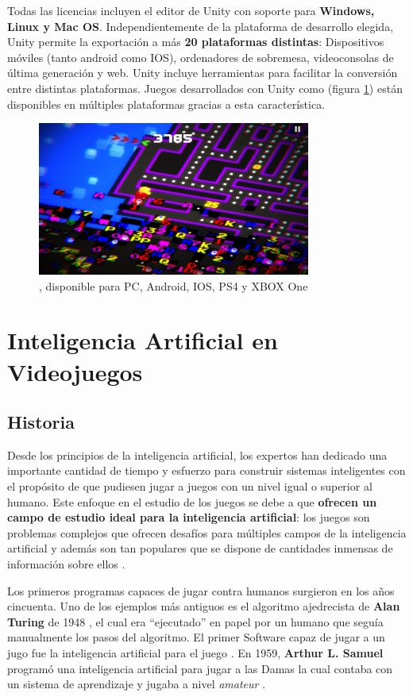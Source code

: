 Todas las licencias incluyen el editor de Unity con soporte para \textbf{Windows, Linux y Mac OS}. Independientemente de la plataforma de desarrollo elegida, Unity permite la exportación a más \textbf{20 plataformas distintas}: Dispositivos móviles (tanto android como IOS), ordenadores de sobremesa, videoconsolas de última generación y web. Unity incluye herramientas para facilitar la conversión entre distintas plataformas. Juegos desarrollados con Unity como  (figura \ref{pacman-256}) están disponibles en múltiples plataformas gracias a esta característica.
\begin{figure}[h]
	\includegraphics[width=0.8\textwidth]{images/estadodelarte/motores/pacman-256}
	\centering
	\caption{, disponible para PC, Android, IOS, PS4 y XBOX One}
	\label{pacman-256}
\end{figure}

\section{Inteligencia Artificial en Videojuegos}
\subsection{Historia}
Desde los principios de la inteligencia artificial, los expertos han dedicado una importante cantidad de tiempo y esfuerzo para construir sistemas inteligentes con el propósito de que pudiesen jugar a juegos con un nivel igual o superior al humano. Este enfoque en el estudio de los juegos se debe a que \textbf{ofrecen un campo de estudio ideal para la inteligencia artificial}: los juegos son problemas complejos que ofrecen desafíos para múltiples campos de la inteligencia artificial y además son tan populares que se dispone de cantidades inmensas de información sobre ellos \cite{ai_and_games}.

Los primeros programas capaces de jugar contra humanos surgieron en los años cincuenta. Uno de los ejemplos más antiguos es el algoritmo ajedrecista de \textbf{Alan Turing} de 1948 \cite{turing_chess}, el cual era ``ejecutado'' en papel por un humano que seguía manualmente los pasos del algoritmo. El primer Software capaz de jugar a un jugo fue la inteligencia artificial para el juego . En 1959, \textbf{Arthur L. Samuel} \cite{machine_learning} programó una inteligencia artificial para jugar a las Damas la cual contaba con un sistema de aprendizaje y jugaba a nivel \textit{amateur} \cite{ia_moderno}. 

